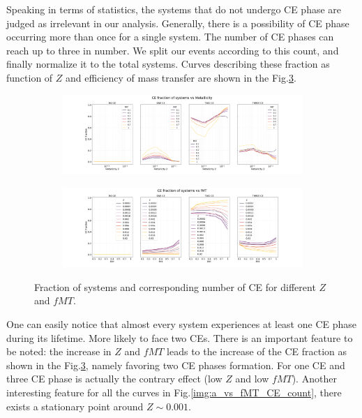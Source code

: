 \documentclass[preprint,12pt]{elsarticle}
\begin{document}
Speaking in terms of statistics, the systems that do not undergo CE phase are judged as irrelevant in our analysis. Generally, there is a possibility of CE phase occurring more than once for a single system. The number of CE phases can reach up to three in number. We split our events according to this count, and finally normalize it to the total systems. Curves describing these fraction as function of $Z$ and efficiency of mass transfer are shown in the Fig.\ref{img:count_CE_fraction}. 

\begin{figure}[ht]
    \begin{subfigure}[t]{1\textwidth}
      \centering
       \includegraphics[width=1\textwidth]{Images/count_CE_vs_metallicity.png}
       \caption{}
       \label{img:count_CE_vs_Z}
    \end{subfigure}
    \begin{subfigure}[t]{1\textwidth}
      \centering
      \includegraphics[width=1\textwidth]{Images/count_CE_vs_fMT.png}
      \label{img:CE_count_vs_fMT}
      \caption{}
    \end{subfigure} 
    \caption{Fraction of systems and corresponding number of CE for different $Z$ and $fMT$.}
    \label{img:count_CE_fraction}
\end{figure}

One can easily notice that almost every system experiences at least one CE phase during its lifetime. More likely to face two CEs. There is an important feature to be noted: the increase in $Z$ and $fMT$ leads to the increase of the CE fraction as shown in the Fig.\ref{img:count_CE_fraction}, namely favoring two CE phases formation. For one CE and three CE phase is actually the contrary effect (low $Z$ and low $fMT$). Another interesting feature for all the curves in Fig.\ref{img:a_vs_fMT_CE_count}, there exists a stationary point around $ Z \sim 0.001$.\\
\end{document}
